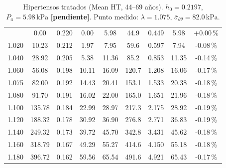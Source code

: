 \documentclass[11pt]{article}
\newcommand{\kPa}{\,\mathrm{kPa}}
\newcommand{\sbar}{\bar\sigma_{\theta\theta}}
\newcommand{\pend}{\textcolor{red!70!black}{\textbf{[pendiente]}}}
\begin{document}
\begin{table}[H]\centering\footnotesize\setlength{\tabcolsep}{3pt}
\caption{Hipertensos tratados (Mean HT, 44--69 años). $h_0=0.2197$, $P_a=5.98\kPa$ \pend. Punto medido: $\lambda=1.075$, $\sbar=82.0\kPa$.}
\begin{tabular}{ccccccccc}\toprule\tablehead1.000 & 0.00 & 0.220 & 0.00 & 5.98 & 44.9 & 0.449 & 5.98 & +0.00\,\% \\
1.020 & 10.23 & 0.212 & 1.97 & 7.95 & 59.6 & 0.597 & 7.94 & -0.08\,\% \\
1.040 & 28.92 & 0.205 & 5.38 & 11.36 & 85.2 & 0.853 & 11.35 & -0.14\,\% \\
1.060 & 56.08 & 0.198 & 10.11 & 16.09 & 120.7 & 1.208 & 16.06 & -0.17\,\% \\
1.075 & 82.00 & 0.192 & 14.43 & 20.41 & 153.1 & 1.533 & 20.38 & -0.18\,\% \\
1.080 & 91.70 & 0.191 & 16.02 & 22.00 & 165.0 & 1.651 & 21.96 & -0.18\,\% \\
1.100 & 135.78 & 0.184 & 22.99 & 28.97 & 217.3 & 2.175 & 28.92 & -0.19\,\% \\
1.120 & 188.32 & 0.178 & 30.92 & 36.90 & 276.8 & 2.771 & 36.83 & -0.19\,\% \\
1.140 & 249.32 & 0.173 & 39.72 & 45.70 & 342.8 & 3.431 & 45.62 & -0.18\,\% \\
1.160 & 318.79 & 0.167 & 49.29 & 55.27 & 414.6 & 4.150 & 55.18 & -0.18\,\% \\
1.180 & 396.72 & 0.162 & 59.56 & 65.54 & 491.6 & 4.921 & 65.43 & -0.17\,\% \\
\bottomrule\end{tabular}\end{table}
\end{document}
